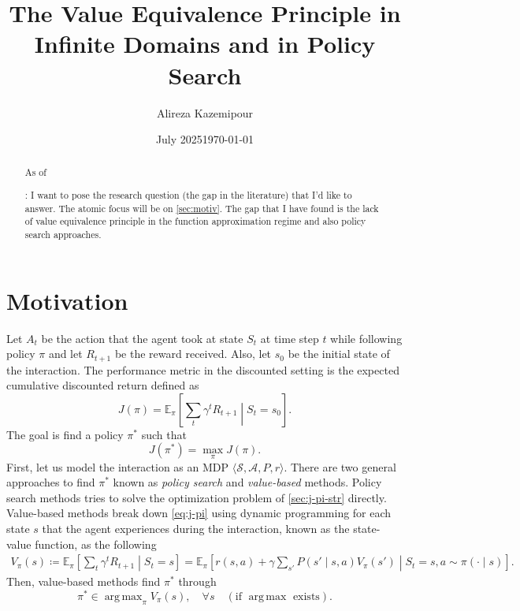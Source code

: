 \documentclass[a4paper]{article}
\title{The Value Equivalence Principle in Infinite Domains and in Policy Search}
\author{Alireza Kazemipour}
\date{July 2025}
\theoremstyle{definition}
\newcommand{\cA}{\mathcal{A}}
\newcommand{\cS}{\mathcal{S}}
\newcommand{\E}{\mathbb{E}}
\DeclareMathOperator*{\argmax}{arg\,max}
\begin{document}
\maketitle

\begin{abstract}
    As of \date{\today}: I want to pose the research question (the gap in the literature) that I'd like to answer. The atomic focus will be on \cref{sec:motiv}. The gap that I have found is the lack of value equivalence principle in the function approximation regime and also policy search approaches.
\end{abstract}

\section{Motivation}
\label{sec:motiv}
Let $A_t$ be the action that the agent took at state $S_t$ at time step $t$ while following policy $\pi$ and let $R_{t+1}$ be the reward received. Also, let $s_0$ be the initial state of the interaction. The performance metric in the discounted setting is the expected cumulative discounted return defined as
\begin{equation}
    \label{eq:j-pi}
    J(\pi) = \E_{\pi}\left[\sum_t \gamma^tR_{t + 1} \middle\vert S_t = s_0\right].
\end{equation}
%
The goal is find a policy $\pi^*$ such that
\begin{equation}
    \label{sec:j-pi-str}
    J(\pi^*) = \max_\pi J(\pi).
\end{equation}
%
First, let us model the interaction as an MDP $\langle\cS, \cA, P, r \rangle$. There are two general approaches to find $\pi^*$ known as \emph{policy search} and \emph{value-based} methods. Policy search methods tries to solve the optimization problem of \cref{sec:j-pi-str} directly. Value-based methods break down \cref{eq:j-pi} using dynamic programming for each state $s$ that the agent experiences during the interaction, known as the state-value function, as the following
\begin{align}
    \label{eq:bllmn-eq}
    V_\pi(s) \coloneq \E_{\pi}\left[\sum_t \gamma^tR_{t + 1} \middle\vert S_t = s\right]
    = \E_\pi \left[r(s, a) + \gamma \sum_{s'}P\left(s' \middle\vert s, a\right)V_\pi\left(s'\right) \middle\vert S_t = s, a \sim \pi(\cdot \mid s)\right].
\end{align}
%
Then, value-based methods find $\pi^*$ through
\begin{equation*}
    \pi^* \in \argmax_{\pi} V_\pi(s), \quad \forall s \quad (\text{if } \argmax \text{ exists}).
\end{equation*}
\end{document}
